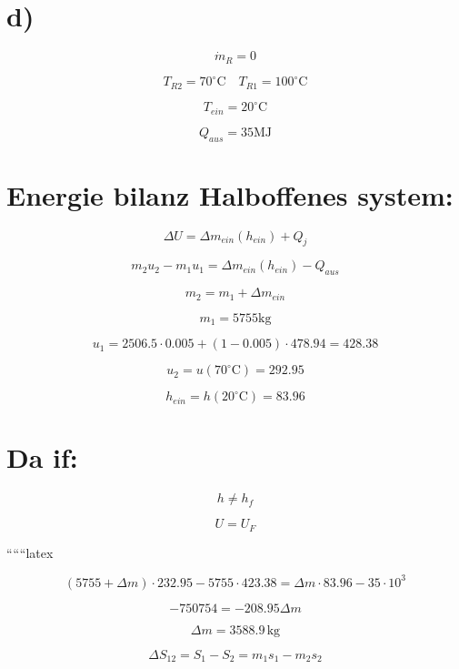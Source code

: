 

\section*{d)}

\[
\dot{m}_R = 0
\]

\[
T_{R2} = 70^\circ \text{C} \quad T_{R1} = 100^\circ \text{C}
\]

\[
T_{ein} = 20^\circ \text{C}
\]

\[
Q_{aus} = 35 \text{MJ}
\]

\section*{Energie bilanz Halboffenes system:}

\[
\Delta U = \Delta m_{ein} (h_{ein}) + Q_j
\]

\[
m_2 u_2 - m_1 u_1 = \Delta m_{ein} (h_{ein}) - Q_{aus}
\]

\[
m_2 = m_1 + \Delta m_{ein}
\]

\[
m_1 = 5755 \text{kg}
\]

\[
u_1 = 2506.5 \cdot 0.005 + (1 - 0.005) \cdot 478.94 = 428.38
\]

\[
u_2 = u (70^\circ \text{C}) = 292.95
\]

\[
h_{ein} = h (20^\circ \text{C}) = 83.96
\]

\section*{Da if:}

\[
h \neq h_f
\]

\[
U = U_F
\]

``````latex

\begin{equation*}
(5755 + \Delta m) \cdot 232.95 - 5755 \cdot 423.38 = \Delta m \cdot 83.96 - 35 \cdot 10^3
\end{equation*}

\begin{equation*}
- 750754 = -208.95 \Delta m
\end{equation*}

\begin{equation*}
\Delta m = 3588.9 \, \text{kg}
\end{equation*}

\begin{equation*}
\Delta S_{12} = S_1 - S_2 = m_1 s_1 - m_2 s_2
\end{equation*}

